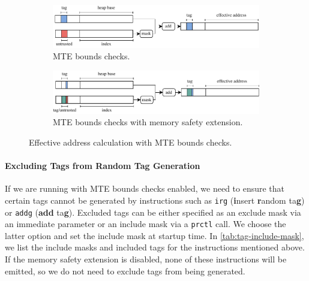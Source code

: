 \begin{figure}[t]
    \centering
    \begin{subfigure}[T]{\textwidth}
        \centering
        \includegraphics{figures/build/bounds}
        \caption{\ac{MTE} bounds checks.}
        \label{fig:mte-bounds-checks}
    \end{subfigure}
    \hfill
    \begin{subfigure}[T]{\textwidth}
        \centering
        \includegraphics{figures/build/bounds-mem-safety}
        \caption{\ac{MTE} bounds checks with memory safety extension.}
        \label{fig:mte-bounds-checks-mem-safety}
    \end{subfigure}
    \caption{Effective address calculation with \ac{MTE} bounds checks.}
    \label{fig:system-design-mem-safety-bounds}
\end{figure}

\paragraph{Excluding Tags from Random Tag Generation}
If we are running with \ac{MTE} bounds checks enabled, we need to ensure that certain tags cannot be generated by instructions such as \texttt{irg} (\textbf{i}nsert \textbf{r}andom ta\textbf{g}) or \texttt{addg} (\textbf{add} ta\textbf{g}).
Excluded tags can be either specified as an exclude mask via an immediate parameter or an include mask via a \texttt{prctl} call.
We choose the latter option and set the include mask at startup time.
In \cref{tab:tag-include-mask}, we list the include masks and included tags for the instructions mentioned above.
If the memory safety extension is disabled, none of these instructions will be emitted, so we do not need to exclude tags from being generated.

